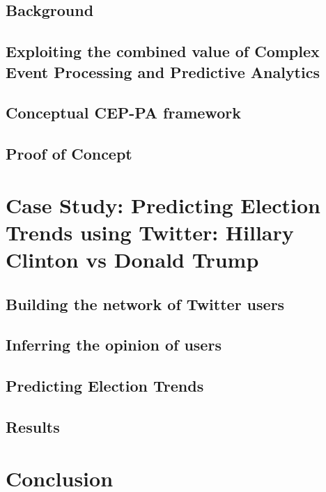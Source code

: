 \documentclass[runningheads]{llncs}
\begin{document}
\subsection{Background}
\subsection{Exploiting the combined value of Complex Event Processing and Predictive Analytics}
\subsection{Conceptual CEP-PA framework}
\subsection{Proof of Concept}
\section{Case Study: Predicting Election Trends using Twitter: Hillary Clinton vs Donald Trump}
\subsection{Building the network of Twitter users}
\subsection{Inferring the opinion of users}
\subsection{Predicting Election Trends}
\subsection{Results}
\section{Conclusion}


\end{document}
